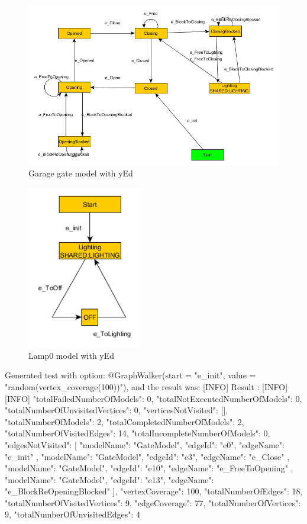 \begin{figure}[!ht]
	\centering
	\includegraphics[width=150mm, keepaspectratio]{figures/GateModel.png}
	\caption{Garage gate model with yEd}
	\label{fig:GateModel}
\end{figure}

\begin{figure}[!ht]
	\centering
	\includegraphics[width=50mm, keepaspectratio]{figures/LightingModel.png}
	\caption{Lamp0 model with yEd}
	\label{fig:GateModel}
\end{figure}


Generated test with option: @GraphWalker(start = "e\_init", value = "random(vertex\_coverage(100))"), and the result was:
[INFO] Result :
[INFO] 
[INFO] {
	"totalFailedNumberOfModels": 0,
	"totalNotExecutedNumberOfModels": 0,
	"totalNumberOfUnvisitedVertices": 0,
	"verticesNotVisited": [],
	"totalNumberOfModels": 2,
	"totalCompletedNumberOfModels": 2,
	"totalNumberOfVisitedEdges": 14,
	"totalIncompleteNumberOfModels": 0,
	"edgesNotVisited": [
	{
		"modelName": "GateModel",
		"edgeId": "e0",
		"edgeName": "e\_init"
	},
	{
		"modelName": "GateModel",
		"edgeId": "e3",
		"edgeName": "e\_Close"
	},
	{
		"modelName": "GateModel",
		"edgeId": "e10",
		"edgeName": "e\_FreeToOpening"
	},
	{
		"modelName": "GateModel",
		"edgeId": "e13",
		"edgeName": "e\_BlockReOpeningBlocked"
	}
	],
	"vertexCoverage": 100,
	"totalNumberOfEdges": 18,
	"totalNumberOfVisitedVertices": 9,
	"edgeCoverage": 77,
	"totalNumberOfVertices": 9,
	"totalNumberOfUnvisitedEdges": 4
}
